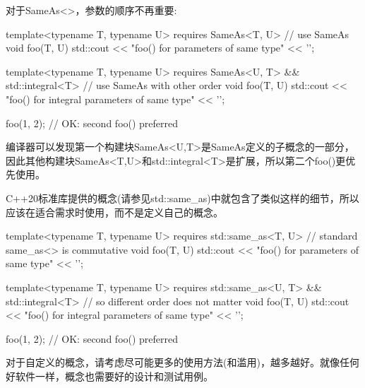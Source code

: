 对于SameAs<>，参数的顺序不再重要:

\begin{cpp}
template<typename T, typename U>
requires SameAs<T, U> // use SameAs
void foo(T, U)
{
	std::cout << "foo() for parameters of same type" << '\n';
}

template<typename T, typename U>
requires SameAs<U, T> && std::integral<T> // use SameAs with other order
void foo(T, U)
{
	std::cout << "foo() for integral parameters of same type" << '\n';
}

foo(1, 2); // OK: second foo() preferred
\end{cpp}

编译器可以发现第一个构建块SameAs<U,T>是SameAs定义的子概念的一部分，因此其他构建块SameAs<T,U>和std::integral<T>是扩展，所以第二个foo()更优先使用。

C++20标准库提供的概念(请参见std::same\_as)中就包含了类似这样的细节，所以应该在适合需求时使用，而不是定义自己的概念。

\begin{cpp}
template<typename T, typename U>
requires std::same_as<T, U> // standard same_as<> is commutative
void foo(T, U)
{
	std::cout << "foo() for parameters of same type" << '\n';
}

template<typename T, typename U>
requires std::same_as<U, T> && std::integral<T> // so different order does not matter
void foo(T, U)
{
	std::cout << "foo() for integral parameters of same type" << '\n';
}

foo(1, 2); // OK: second foo() preferred
\end{cpp}

对于自定义的概念，请考虑尽可能更多的使用方法(和滥用)，越多越好。就像任何好软件一样，概念也需要好的设计和测试用例。












